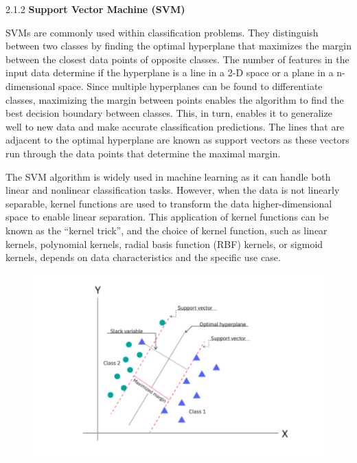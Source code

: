 \documentclass[a4paper]{article}
\theoremstyle{plain}
\theoremstyle{definition}
\begin{document}
2.1.2 \textbf{Support Vector Machine (SVM) \newline}

SVMs are commonly used within classification problems. They distinguish between two classes by finding the optimal hyperplane that maximizes the margin between the closest data points of opposite classes. The number of features in the input data determine if the hyperplane is a line in a 2-D space or a plane in a n-dimensional space. Since multiple hyperplanes can be found to differentiate classes, maximizing the margin between points enables the algorithm to find the best decision boundary between classes. This, in turn, enables it to generalize well to new data and make accurate classification predictions. The lines that are adjacent to the optimal hyperplane are known as support vectors as these vectors run through the data points that determine the maximal margin.

The SVM algorithm is widely used in machine learning as it can handle both linear and nonlinear classification tasks. However, when the data is not linearly separable, kernel functions are used to transform the data higher-dimensional space to enable linear separation. This application of kernel functions can be known as the “kernel trick”, and the choice of kernel function, such as linear kernels, polynomial kernels, radial basis function (RBF) kernels, or sigmoid kernels, depends on data characteristics and the specific use case.\newline

\begin{figure}[htbp] %
    \includegraphics[width=1\textwidth]{figs/SVM.png} %
    \label{fig:example}
\end{figure}\newline
\end{document}
